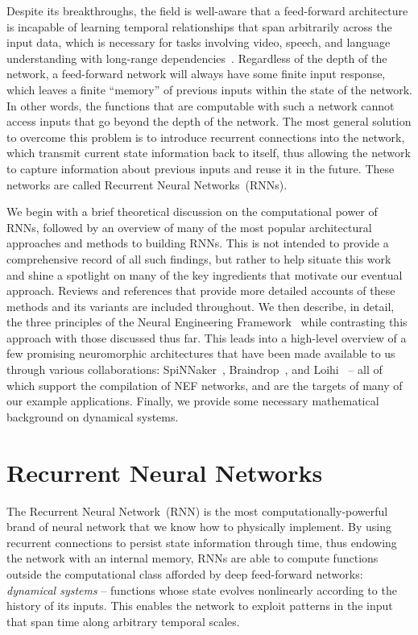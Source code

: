 Despite its breakthroughs, the field is well-aware that a feed-forward architecture is incapable of learning temporal relationships that span arbitrarily across the input data, which is necessary for tasks involving video, speech, and language understanding with long-range dependencies~\citep{bengio1994learning}.
Regardless of the depth of the network, a feed-forward network will always have some finite input response, which leaves a finite ``memory'' of previous inputs within the state of the network.
In other words, the functions that are computable with such a network cannot access inputs that go beyond the depth of the network.
The most general solution to overcome this problem is to introduce recurrent connections into the network, which transmit current state information back to itself, thus allowing the network to capture information about previous inputs and reuse it in the future. 
These networks are called Recurrent Neural Networks~(RNNs).

We begin with a brief theoretical discussion on the computational power of RNNs, followed by an overview of many of the most popular architectural approaches and methods to building RNNs.
This is not intended to provide a comprehensive record of all such findings, but rather to help situate this work and shine a spotlight on many of the key ingredients that motivate our eventual approach.
Reviews and references that provide more detailed accounts of these methods and its variants are included throughout.
We then describe, in detail, the three principles of the Neural Engineering Framework~\citep[NEF;][]{eliasmith2003a} while contrasting this approach with those discussed thus far.
This leads into a high-level overview of a few promising neuromorphic architectures that have been made available to us through various collaborations: SpiNNaker~\citep{furber2014spinnaker}, Braindrop~\citep{braindrop2019}, and Loihi~\citep{davies2018loihi} -- all of which support the compilation of NEF networks, and are the targets of many of our example applications.
Finally, we provide some necessary mathematical background on dynamical systems.

\section{Recurrent Neural Networks}

The Recurrent Neural Network~(RNN) is the most computationally-powerful brand of neural network that we know how to physically implement.
By using recurrent connections to persist state information through time, thus endowing the network with an internal memory, RNNs are able to compute functions outside the computational class afforded by deep feed-forward networks: \emph{dynamical systems} -- functions whose state evolves nonlinearly according to the history of its inputs.
This enables the network to exploit patterns in the input that span time along arbitrary temporal scales.

